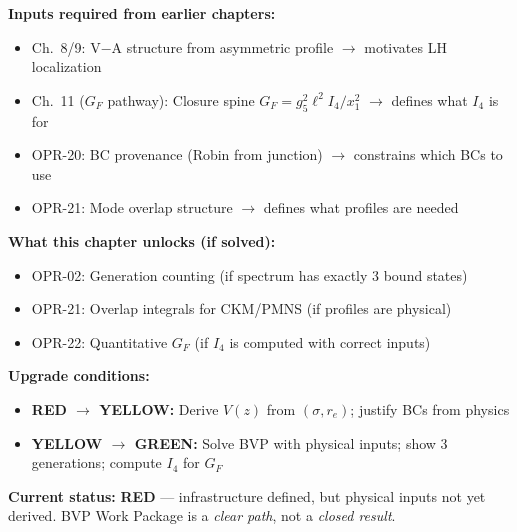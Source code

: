 \begin{tcolorbox}[colback=blue!5!white, colframe=blue!50!black,
    title=\textbf{Dependency \& Status (IF/THEN)}]

\textbf{Inputs required from earlier chapters:}
\begin{itemize}[nosep]
    \item Ch.~8/9: V$-$A structure from asymmetric profile $\to$ motivates LH localization
    \item Ch.~11 ($G_F$ pathway): Closure spine $G_F = g_5^2 \ell^2 I_4/x_1^2$ $\to$ defines what $I_4$ is for
    \item OPR-20: BC provenance (Robin from junction) $\to$ constrains which BCs to use
    \item OPR-21: Mode overlap structure $\to$ defines what profiles are needed
\end{itemize}

\textbf{What this chapter unlocks (if solved):}
\begin{itemize}[nosep]
    \item OPR-02: Generation counting (if spectrum has exactly 3 bound states)
    \item OPR-21: Overlap integrals for CKM/PMNS (if profiles are physical)
    \item OPR-22: Quantitative $G_F$ (if $I_4$ is computed with correct inputs)
\end{itemize}

\textbf{Upgrade conditions:}
\begin{itemize}[nosep]
    \item \textbf{RED $\to$ YELLOW:} Derive $V(z)$ from $(\sigma, r_e)$; justify BCs from physics
    \item \textbf{YELLOW $\to$ GREEN:} Solve BVP with physical inputs; show 3 generations; compute $I_4$ for $G_F$
\end{itemize}

\textbf{Current status:} \textcolor{BrickRed}{\textbf{RED}} --- infrastructure defined, but
physical inputs not yet derived. BVP Work Package is a \emph{clear path}, not a \emph{closed result}.
\end{tcolorbox}


